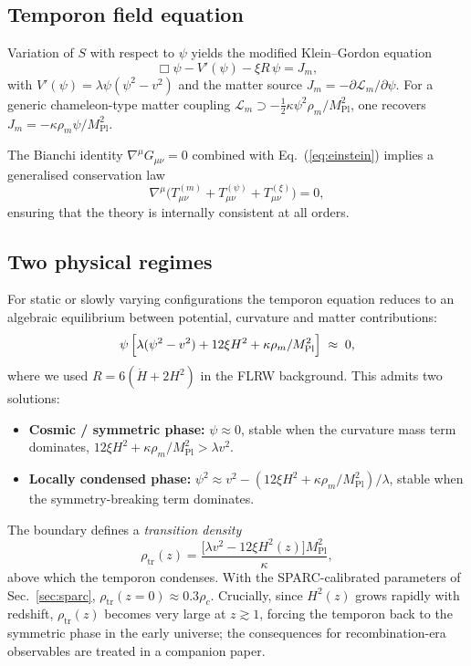 \documentclass[%
    aps,
    prd,
    reprint,
    superscriptaddress,
    nofootinbib,
    floatfix,
    amsmath,amssymb,
]{revtex4-2}
\newcommand{\MPl}{M_{\mathrm{Pl}}}
\begin{document}
\subsection{Temporon field equation}

Variation of $S$ with respect to $\psi$ yields the
modified Klein--Gordon equation
\begin{equation}
\label{eq:KG}
\Box\psi - V'(\psi) - \xi R\,\psi = J_{m},
\end{equation}
with $V'(\psi) = \lambda\psi(\psi^{2}-v^{2})$ and the matter
source $J_{m} = -\partial\mathcal{L}_{m}/\partial\psi$. For a
generic chameleon-type matter coupling $\mathcal{L}_{m} \supset
-\tfrac{1}{2}\kappa\psi^{2}\rho_{m}/\MPl^{2}$, one recovers
$J_{m} = -\kappa\rho_{m}\psi/\MPl^{2}$.

The Bianchi identity $\nabla^{\mu}G_{\mu\nu}=0$ combined with
Eq.~(\ref{eq:einstein}) implies a generalised conservation law
\begin{equation}
\nabla^{\mu}\bigl(T^{(m)}_{\mu\nu}+T^{(\psi)}_{\mu\nu}+T^{(\xi)}_{\mu\nu}\bigr)=0,
\end{equation}
ensuring that the theory is internally consistent at all orders.

\subsection{Two physical regimes}
\label{sec:regimes}

For static or slowly varying configurations the temporon equation
reduces to an algebraic equilibrium between potential, curvature
and matter contributions:
\begin{equation}
\label{eq:algebraic}
\psi\,\Bigl[\lambda(\psi^{2}-v^{2}) + 12\xi H^{2} + \kappa\rho_{m}/\MPl^{2}\Bigr]
   \;\approx\; 0,
\end{equation}
where we used $R = 6(\dot{H}+2H^{2})$ in the FLRW background.
This admits two solutions:
\begin{itemize}
\item \textbf{Cosmic / symmetric phase:} $\psi \approx 0$,
      stable when the curvature mass term dominates,
      $12\xi H^{2} + \kappa\rho_{m}/\MPl^{2} > \lambda v^{2}$.
\item \textbf{Locally condensed phase:} $\psi^{2} \approx v^{2} -
      (12\xi H^{2}+\kappa\rho_{m}/\MPl^{2})/\lambda$, stable when
      the symmetry-breaking term dominates.
\end{itemize}

The boundary defines a \emph{transition density}
\begin{equation}
\label{eq:rho_transition}
\rho_{\mathrm{tr}}(z) =
\frac{\bigl[\lambda v^{2} - 12\xi H^{2}(z)\bigr]\MPl^{2}}{\kappa},
\end{equation}
above which the temporon condenses. With the SPARC-calibrated
parameters of Sec.~\ref{sec:sparc},
$\rho_{\mathrm{tr}}(z=0) \approx 0.3\rho_{c}$. Crucially, since
$H^{2}(z)$ grows rapidly with redshift, $\rho_{\mathrm{tr}}(z)$
becomes very large at $z\gtrsim 1$, forcing the temporon back to
the symmetric phase in the early universe; the consequences for
recombination-era observables are treated in a companion paper.
\end{document}
